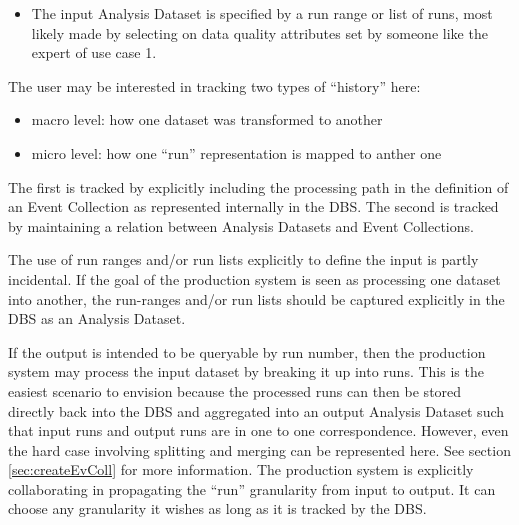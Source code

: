 \documentclass{cmspaper}
\begin{document}

\begin{itemize}
\item The input Analysis Dataset is specified by a run range or list
     of runs, most likely made by selecting on data quality attributes set by
     someone like the expert of use case 1.  
\end{itemize}

The user may be interested in tracking two types of ``history'' here:
\begin{itemize}
      \item macro level: how one dataset was transformed to another
      \item micro level: how one ``run'' representation is mapped to anther one
\end{itemize}
The first is tracked by explicitly including the processing path in the
definition of an Event Collection as represented internally in the DBS.  
The second is tracked by maintaining a relation between Analysis Datasets
and Event Collections.

The use of run ranges and/or run lists explicitly to define the input is 
partly incidental. If the goal of the production system is seen as
processing one dataset into another, the run-ranges and/or run lists 
should be captured explicitly in the DBS as an Analysis Dataset. 

If the output is intended to be queryable by run number, then the production 
system may process the input dataset by breaking it up into runs.  This is the 
easiest scenario to envision because the processed runs can then be stored 
directly back into the DBS and aggregated into an output Analysis Dataset such
that input runs and output runs are in one to one correspondence.
However, even the hard case involving splitting and merging can be represented here. 
See section \ref{sec:createEvColl} for more information. 
The production system is explicitly collaborating in propagating the
``run'' granularity from input to output.  It can choose any granularity it 
wishes as long as it is tracked by the DBS.  
\end{document}
